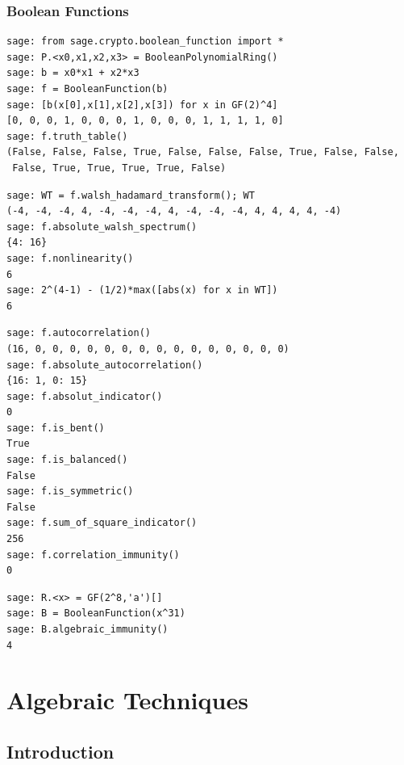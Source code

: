 \documentclass[9pt]{beamer}
\begin{document}
\begin{frame}
\frametitle{Boolean Functions}


\begin{lstlisting}
sage: from sage.crypto.boolean_function import *
sage: P.<x0,x1,x2,x3> = BooleanPolynomialRing()
sage: b = x0*x1 + x2*x3
sage: f = BooleanFunction(b)
sage: [b(x[0],x[1],x[2],x[3]) for x in GF(2)^4]
[0, 0, 0, 1, 0, 0, 0, 1, 0, 0, 0, 1, 1, 1, 1, 0]
sage: f.truth_table()
(False, False, False, True, False, False, False, True, False, False,
 False, True, True, True, True, False)
\end{lstlisting}

\framebreak

\begin{lstlisting}
sage: WT = f.walsh_hadamard_transform(); WT
(-4, -4, -4, 4, -4, -4, -4, 4, -4, -4, -4, 4, 4, 4, 4, -4)
sage: f.absolute_walsh_spectrum()
{4: 16}
sage: f.nonlinearity()
6
sage: 2^(4-1) - (1/2)*max([abs(x) for x in WT])
6
\end{lstlisting}

\framebreak

\begin{lstlisting}
sage: f.autocorrelation()
(16, 0, 0, 0, 0, 0, 0, 0, 0, 0, 0, 0, 0, 0, 0, 0)
sage: f.absolute_autocorrelation()
{16: 1, 0: 15}
sage: f.absolut_indicator()
0
sage: f.is_bent()
True
sage: f.is_balanced()
False
sage: f.is_symmetric()
False
sage: f.sum_of_square_indicator()
256
sage: f.correlation_immunity()
0
\end{lstlisting}

\begin{lstlisting}
sage: R.<x> = GF(2^8,'a')[]
sage: B = BooleanFunction(x^31)
sage: B.algebraic_immunity()
4
\end{lstlisting}
\end{frame}

\section{Algebraic Techniques}

\subsection{Introduction}
\end{document}

